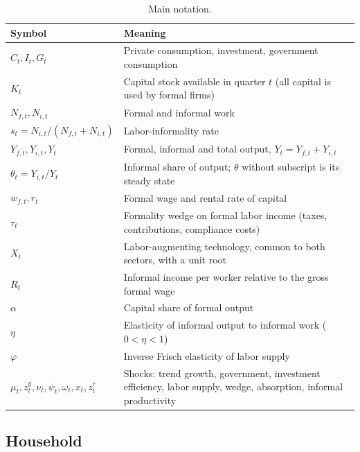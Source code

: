 \begin{table}[H]
\centering
\caption{Main notation.}
\label{tab:notation}
\footnotesize
\begin{tabularx}{\textwidth}{l X}
\toprule
\textbf{Symbol} & \textbf{Meaning} \\
\midrule
$C_t, I_t, G_t$ & Private consumption, investment, government consumption \\
$K_t$ & Capital stock available in quarter $t$ (all capital is used by formal firms) \\
$N_{f,t}, N_{i,t}$ & Formal and informal work \\
$s_t = N_{i,t}/(N_{f,t}+N_{i,t})$ & Labor-informality rate \\
$Y_{f,t}, Y_{i,t}, Y_t$ & Formal, informal and total output, $Y_t = Y_{f,t}+Y_{i,t}$ \\
$\theta_t = Y_{i,t}/Y_t$ & Informal share of output; $\theta$ without subscript is its steady state \\
$w_{f,t}, r_t$ & Formal wage and rental rate of capital \\
$\tau_t$ & Formality wedge on formal labor income (taxes, contributions, compliance costs) \\
$X_t$ & Labor-augmenting technology, common to both sectors, with a unit root \\
$R_t$ & Informal income per worker relative to the gross formal wage \\
$\alpha$ & Capital share of formal output \\
$\eta$ & Elasticity of informal output to informal work ($0<\eta<1$) \\
$\varphi$ & Inverse Frisch elasticity of labor supply \\
$\mu_t, z^g_t, \nu_t, \psi_t, \omega_t, x_t, z^r_t$ & Shocks: trend growth, government, investment efficiency, labor supply, wedge, absorption, informal productivity \\
\bottomrule
\end{tabularx}
\end{table}

\subsection{Household}
\label{sec:household}

